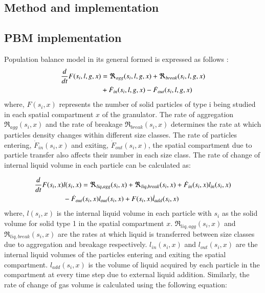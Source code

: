 \documentclass[preprint,10pt,authoryear,review]{elsarticle}
\begin{document}
\begin{linenumbers}
\section{Method and implementation}
\label{secMethods}
\subsection{PBM implementation}
Population balance model in its general formed is expressed as follows \citep{ramkrishna2014}:
\begin{align}
\frac{d}{dt}F(s_i,l,g,x)&=\Re_{agg}(s_i,l,g,x)+\Re_{break}(s_i,l,g,x)\notag\\ 
&+\dot{F}_{in}(s_i,l,g,x)-\dot{F}_{out}(s_i,l,g,x)
\label{eqn:mthds_pbm_overall} 
\end{align}
where, $F(s_i,x)$ represents the number of solid particles of type i being studied in each spatial 
compartment $x$ of the granulator. The rate of aggregation $\Re_{agg}(s_i,x)$ 
and the rate of breakage $\Re_{break}(s_i,x)$ determines the rate at which particles density
changes within different size classes. The rate of particles entering, $\dot{F}_{in}(s_i,x)$ 
and exiting, $\dot{F}_{out}(s_i,x)$, the spatial compartment due to particle transfer also 
affects their number in each size class. The rate of change of internal liquid volume in each 
particle can be calculated as: 

\begin{align}
\frac{d}{dt}F(s_i,x)&l(s_i,x)= 
\Re_{liq,agg}(s_i,x)+\Re_{liq,break}(s_i,x)+\dot{F}_{in}(s_i,x)l_{in}(s_i,x)\notag\\
&-\dot{F}_{out}(s_i,x)l_{out}(s_i,x)+F(s_i,x)\dot{l}_{add}(s_i,x)
\label{eqn:mthds_pbm_rate} 
\end{align}
where, $l(s_i,x)$ is the internal liquid volume in each particle with ${s_i}$ as the 
solid volume for solid type 1 in the spatial compartment $x$. 
$\Re_{liq,agg}(s_i,x)$ and $\Re_{liq,break}(s_i,x)$ are the rates at which liquid is transferred 
between size classes due to aggregation and breakage respectively. $l_{in}(s_i,x)$ 
and $l_{out}(s_i,x)$ are the internal liquid volumes of the particles entering and exiting 
the spatial compartment. $l_{add}(s_i,x)$ is the volume of liquid acquired 
by each particle in the compartment at every time step due to external liquid addition.
Similarly, the rate of change of gas volume is calculated using the following equation: 


\end{linenumbers}
\end{document}
